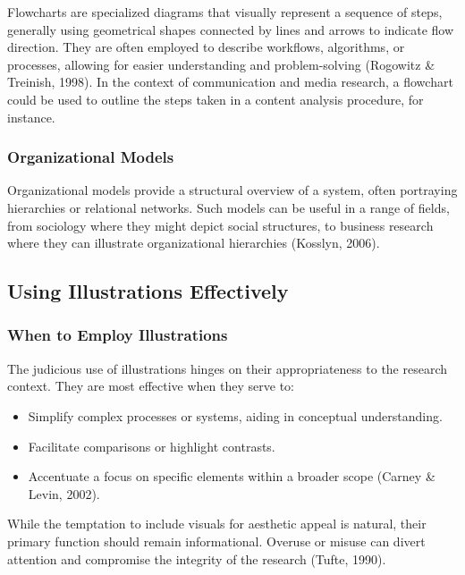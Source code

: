 \documentclass[
  b5paper]{book}
\providecommand{\tightlist}{%
  \setlength{\itemsep}{0pt}\setlength{\parskip}{0pt}}
\begin{document}
Flowcharts are specialized diagrams that visually represent a sequence of steps, generally using geometrical shapes connected by lines and arrows to indicate flow direction. They are often employed to describe workflows, algorithms, or processes, allowing for easier understanding and problem-solving (Rogowitz \& Treinish, 1998). In the context of communication and media research, a flowchart could be used to outline the steps taken in a content analysis procedure, for instance.

\hypertarget{organizational-models}{%
\subsubsection{Organizational Models}\label{organizational-models}}

Organizational models provide a structural overview of a system, often portraying hierarchies or relational networks. Such models can be useful in a range of fields, from sociology where they might depict social structures, to business research where they can illustrate organizational hierarchies (Kosslyn, 2006).

\hypertarget{using-illustrations-effectively}{%
\subsection{Using Illustrations Effectively}\label{using-illustrations-effectively}}

\hypertarget{when-to-employ-illustrations}{%
\subsubsection{When to Employ Illustrations}\label{when-to-employ-illustrations}}

The judicious use of illustrations hinges on their appropriateness to the research context. They are most effective when they serve to:

\begin{itemize}
\tightlist
\item
  Simplify complex processes or systems, aiding in conceptual understanding.
\item
  Facilitate comparisons or highlight contrasts.
\item
  Accentuate a focus on specific elements within a broader scope (Carney \& Levin, 2002).
\end{itemize}

While the temptation to include visuals for aesthetic appeal is natural, their primary function should remain informational. Overuse or misuse can divert attention and compromise the integrity of the research (Tufte, 1990).
\end{document}

